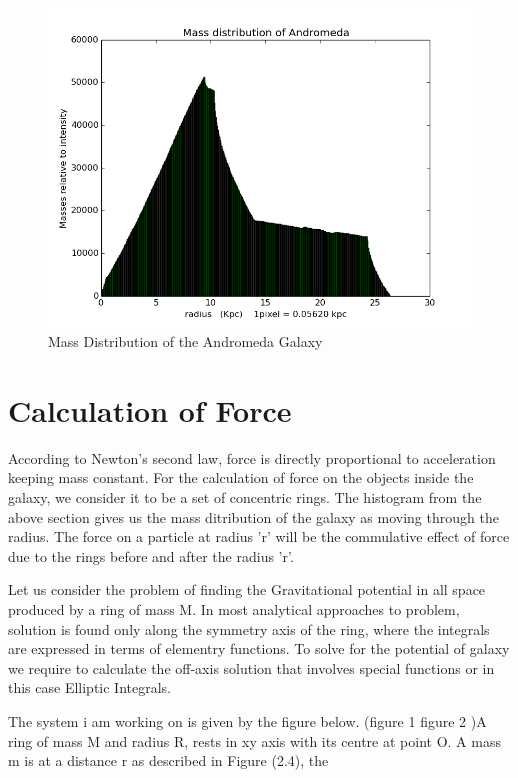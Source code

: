 \begin{enumerate}
\begin{verbatim}
\end{verbatim}

\begin{figure} [h]
\centering
\includegraphics[scale=0.45]{400}
\caption{Mass Distribution of the Andromeda Galaxy }
\end{figure}

\end{enumerate}

\section{Calculation of Force}

According to Newton's second law, force is directly proportional to acceleration keeping mass constant. For the calculation of force on the objects inside the galaxy, we consider it to be a set of concentric rings. The histogram from the above section gives us the mass ditribution of the galaxy as moving through the radius. The force on a particle at radius 'r' will be the commulative effect of force due to the rings before and after the radius 'r'.

Let us consider the problem of finding the Gravitational potential in all space produced by a ring of mass M. In most analytical approaches to problem, solution is found only along the symmetry axis of the ring, where the integrals are expressed in terms of elementry functions. To solve for the potential of galaxy we require to calculate the off-axis solution that involves special functions or in this case Elliptic Integrals.
 
The system i am working on is given by the figure below. (figure 1 figure 2 )A ring of mass M and radius R, rests in xy axis with its centre at point O. A mass m is at a distance r as described in Figure (2.4), the 

